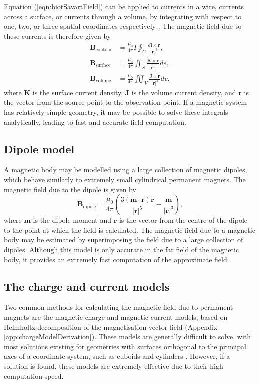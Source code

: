 Equation (\ref{eqn:biotSavartField}) can be applied to currents in a wire, currents across a surface, or currents through a volume, by integrating with respect to one, two, or three spatial coordinates respectively \cite{Fernow2016}. The magnetic field due to these currents is therefore given by
\begin{align}
    \mathbf{B}_\text{contour} &= \frac{\mu_0}{4\pi}I \oint_C \frac{d\mathbf{l} \times \mathbf{r}}{\left|\mathbf{r}\right|^3} \text{,} \nonumber \\
    \mathbf{B}_\text{surface} &= \frac{\mu_0}{4\pi} \iint_S \frac{\mathbf{K} \times \mathbf{r}}{\left|\mathbf{r}\right|^3} ds \text{,} \\
    \mathbf{B}_\text{volume} &= \frac{\mu_0}{4\pi} \iiint_V \frac{\mathbf{J} \times \mathbf{r}}{\left|\mathbf{r}\right|^3} dv \text{,} \nonumber
\end{align}
where \(\mathbf{K}\) is the surface current density, \(\mathbf{J}\) is the volume current density, and \(\mathbf{r}\) is the vector from the source point to the observation point. If a magnetic system has relatively simple geometry, it may be possible to solve these integrals analytically, leading to fast and accurate field computation.


\subsection{Dipole model}
A magnetic body may be modelled using a large collection of magnetic dipoles, which behave similarly to extremely small cylindrical permanent magnets. The magnetic field due to the dipole is given by \cite{Furlani2001}
\begin{equation}
    \mathbf{B}_\text{dipole} = \frac{\mu_0}{4\pi} \left( \frac{3\left(\mathbf{m}\cdot\mathbf{r}\right)\mathbf{r}}{\left|\mathbf{r}\right|^5} - \frac{\mathbf{m}}{\left|\mathbf{r}\right|^3} \right) \text{,}
\end{equation}
where \(\mathbf{m}\) is the dipole moment and \(\mathbf{r}\) is the vector from the centre of the dipole to the point at which the field is calculated. The magnetic field due to a magnetic body may be estimated by superimposing the field due to a large collection of dipoles. Although this model is only accurate in the far field of the magnetic body, it provides an extremely fast computation of the approximate field.


\subsection{The charge and current models}
Two common methods for calculating the magnetic field due to permanent magnets are the magnetic charge and magnetic current models, based on Helmholtz decomposition of the magnetisation vector field (Appendix \ref{app:chargeModelDerivation}). These models are generally difficult to solve, with most solutions existing for geometries with surfaces orthogonal to the principal axes of a coordinate system, such as cuboids \cite{Akoun1984} and cylinders \cite{Caciagli2018}. However, if a solution is found, these models are extremely effective due to their high computation speed.

